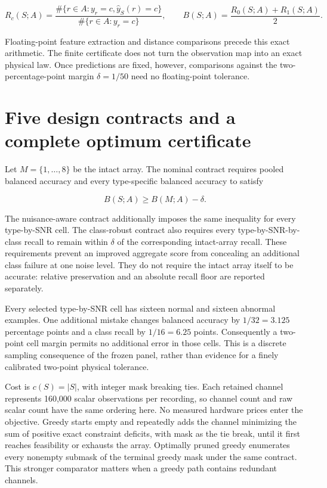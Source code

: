 \documentclass[
  11pt,
  a4paper,
]{report}
\begin{document}
\[
R_c(S;A)=\frac{\#\{r\in A:y_r=c,\widehat y_S(r)=c\}}{\#\{r\in A:y_r=c\}},
\qquad B(S;A)=\frac{R_0(S;A)+R_1(S;A)}2.
\]

Floating-point feature extraction and distance comparisons precede this
exact arithmetic. The finite certificate does not turn the observation
map into an exact physical law. Once predictions are fixed, however,
comparisons against the two-percentage-point margin \(\delta=1/50\) need
no floating-point tolerance.

\hypertarget{five-design-contracts-and-a-complete-optimum-certificate}{%
\section{Five design contracts and a complete optimum
certificate}\label{five-design-contracts-and-a-complete-optimum-certificate}}

Let \(M=\{1,\ldots,8\}\) be the intact array. The nominal contract
requires pooled balanced accuracy and every type-specific balanced
accuracy to satisfy

\[
B(S;A)\ge B(M;A)-\delta.
\]

The nuisance-aware contract additionally imposes the same inequality for
every type-by-SNR cell. The class-robust contract also requires every
type-by-SNR-by-class recall to remain within \(\delta\) of the
corresponding intact-array recall. These requirements prevent an
improved aggregate score from concealing an additional class failure at
one noise level. They do not require the intact array itself to be
accurate: relative preservation and an absolute recall floor are
reported separately.

Every selected type-by-SNR cell has sixteen normal and sixteen abnormal
examples. One additional mistake changes balanced accuracy by
\(1/32=3.125\) percentage points and a class recall by \(1/16=6.25\)
points. Consequently a two-point cell margin permits no additional error
in those cells. This is a discrete sampling consequence of the frozen
panel, rather than evidence for a finely calibrated two-point physical
tolerance.

Cost is \(c(S)=|S|\), with integer mask breaking ties. Each retained
channel represents 160,000 scalar observations per recording, so channel
count and raw scalar count have the same ordering here. No measured
hardware prices enter the objective. Greedy starts empty and repeatedly
adds the channel minimizing the sum of positive exact constraint
deficits, with mask as the tie break, until it first reaches feasibility
or exhausts the array. Optimally pruned greedy enumerates every nonempty
submask of the terminal greedy mask under the same contract. This
stronger comparator matters when a greedy path contains redundant
channels.
\end{document}
